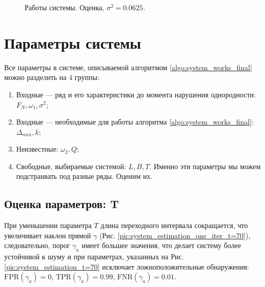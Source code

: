 \documentclass[specialist, substylefile = spbu.rtx,
			   subf, href, 12pt]{disser}
\begin{document}
\begin{figure}[!hhh]
	\caption{Работы системы. Оценка, $ \sigma^2=0.0625 $.}
	\label{pic:system_estimation_small_sd}
\end{figure}



\section{Параметры системы}

Все параметры в системе, описываемой алгоритмом \ref{algo:system_works_final} можно разделить на $ 4 $ группы:
\begin{enumerate}
	\item Входные --- ряд и его характеристики до момента нарушения однородности: $ F_N, \omega_1, \sigma^2 $;
	\item Входные --- необходимые для работы алгоритма \ref{algo:system_works_final}: $ \Delta_{min}, k $;
	\item Неизвестные: $ \omega_2, Q $;
	\item Свободные, выбираемые системой: $ L, B, T $. Именно эти параметры мы можем подстраивать под разные ряды. Оценим их.
\end{enumerate}

\subsection{Оценка параметров: T}

При уменьшении параметра $ T $ длина переходного интервала сокращается, что увеличивает наклон прямой $ \gamma $ (Рис. \ref{pic:system_estimation_one_iter_t=70}), следовательно, порог $ \gamma_a $ имеет большее значения, что делает систему более устойчивой к шуму и при параметрах, указанных на Рис. \ref{pic:system_estimation_t=70} исключает ложноположительные обнаружения: $ \mathrm{FPR}(\gamma_a) = 0 $, $ \mathrm{TPR}(\gamma_a) = 0.99 $,  $ \mathrm{FNR}(\gamma_a) = 0.01 $.
\end{document}
